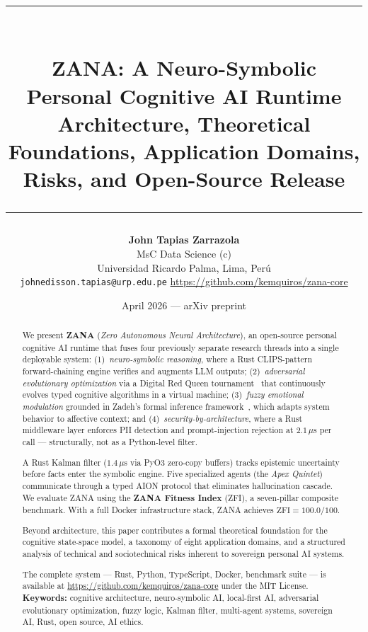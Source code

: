 \documentclass[12pt,a4paper]{article}
\title{
  {\color{xblue}\rule{\linewidth}{2pt}} \\[1em]
  \textbf{\huge ZANA: A Neuro-Symbolic Personal Cognitive AI Runtime} \\[0.4em]
  \large Architecture, Theoretical Foundations, Application Domains,
         Risks, and Open-Source Release \\[0.4em]
  {\color{xblue}\rule{\linewidth}{0.5pt}}
}
\author{
  \textbf{John Tapias Zarrazola} \\
  \small{MsC Data Science (c)} \\
  \small{Universidad Ricardo Palma, Lima, Per\'{u}} \\
  \small{\texttt{johnedisson.tapias@urp.edu.pe} \quad
    \url{https://github.com/kemquiros/zana-core}}
}
\date{April 2026 \quad --- \quad arXiv preprint}
\begin{document}
\maketitle

\begin{abstract}
\noindent
We present \textbf{ZANA} (\emph{Zero Autonomous Neural Architecture}), an open-source personal
cognitive AI runtime that fuses four previously separate research threads into a single
deployable system: (1)~\emph{neuro-symbolic reasoning}, where a Rust CLIPS-pattern
forward-chaining engine verifies and augments LLM outputs; (2)~\emph{adversarial evolutionary
optimization} via a Digital Red Queen tournament~\cite{kumar2025redqueen} that continuously
evolves typed cognitive algorithms in a virtual machine; (3)~\emph{fuzzy emotional modulation}
grounded in Zadeh's formal inference framework~\cite{zadeh1965fuzzysets,zadeh1975fuzzylogic},
which adapts system behavior to affective context; and (4)~\emph{security-by-architecture},
where a Rust middleware layer enforces PII detection and prompt-injection rejection at
$2.1\,\mu$s per call --- structurally, not as a Python-level filter.

A Rust Kalman filter ($1.4\,\mu$s via PyO3 zero-copy buffers) tracks epistemic uncertainty
before facts enter the symbolic engine. Five specialized agents (the \emph{Apex Quintet})
communicate through a typed AION protocol that eliminates hallucination cascade. We evaluate
ZANA using the \textbf{ZANA Fitness Index} (ZFI), a seven-pillar composite benchmark. With a
full Docker infrastructure stack, ZANA achieves $\mathrm{ZFI} = 100.0/100$.

Beyond architecture, this paper contributes a formal theoretical foundation for the
cognitive state-space model, a taxonomy of eight application domains, and a structured
analysis of technical and sociotechnical risks inherent to sovereign personal AI systems.

The complete system --- Rust, Python, TypeScript, Docker, benchmark suite --- is available at
\url{https://github.com/kemquiros/zana-core} under the MIT License.
\bigskip\\
\noindent\textbf{Keywords:} cognitive architecture, neuro-symbolic AI, local-first AI,
adversarial evolutionary optimization, fuzzy logic, Kalman filter, multi-agent systems,
sovereign AI, Rust, open source, AI ethics.
\end{abstract}

\newpage
\tableofcontents
\newpage
\end{document}
